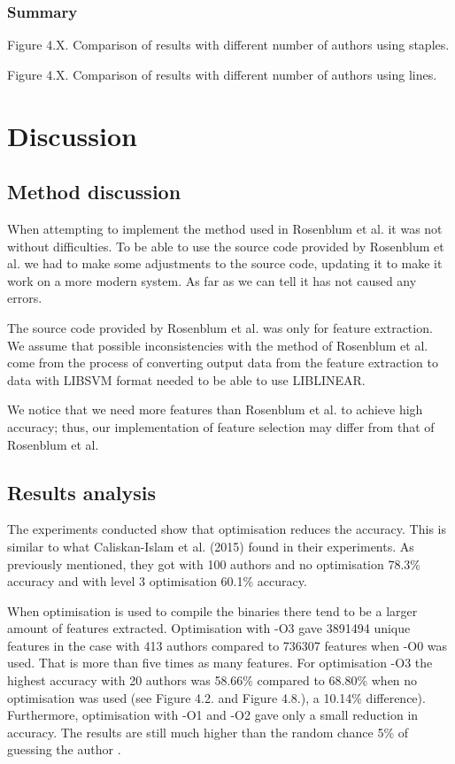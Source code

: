 \documentclass[a4paper,11pt]{kth-mag}
\begin{document}
\subsection{Summary}
Figure 4.X. Comparison of results with different number of authors using
staples.

Figure 4.X. Comparison of results with different number of authors using lines.


\chapter{Discussion}
\section{Method discussion}
When attempting to implement the method used in Rosenblum et al. it was not
without difficulties. To be able to use the source code provided by Rosenblum
et al. we had to make some adjustments to the source code, updating it to make
it work on a more modern system. As far as we can tell it has not caused any
errors.

The source code provided by Rosenblum et al. was only for feature extraction.
We assume that possible inconsistencies with the method of Rosenblum et al.
come from the process of converting output data from the feature extraction to
data with LIBSVM format needed to be able to use LIBLINEAR.

We notice that we need more features than Rosenblum et al. to achieve high
accuracy; thus, our implementation of feature selection may differ from that of
Rosenblum et al. 

\section{Results analysis}
The experiments conducted show that optimisation reduces the accuracy. This is
similar to what Caliskan-Islam et al. (2015) found in their experiments. As
previously mentioned, they got with 100 authors and no optimisation 78.3\%
accuracy and with level 3 optimisation 60.1\% accuracy.

When optimisation is used to compile the binaries there tend to be a larger
amount of features extracted. Optimisation with -O3 gave 3891494 unique
features in the case with 413 authors compared to 736307 features when -O0 was
used. That is more than five times as many features. For optimisation -O3  the
highest accuracy with 20 authors was 58.66\% compared to 68.80\% when no
optimisation was used (see Figure 4.2. and Figure 4.8.), a 10.14\% difference).
Furthermore, optimisation with -O1 and -O2 gave only a small reduction in
accuracy. The results are still much higher than the random chance 5\% of
guessing the author . 
\end{document}
